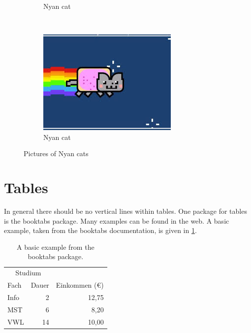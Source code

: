 \documentclass[12pt, %
               a4paper, %
               twoside, %
               openright, %
               abstract=on, %
               DIV=11,      %
               BCOR=8mm]{scrbook} %
\begin{document}
\begin{figure}
\begin{subfigure}[b]{0.3\textwidth}
                \caption{Nyan cat}
                \label{fig:cat2} 
        \end{subfigure}
        ~ %
        \begin{subfigure}[b]{0.3\textwidth}
                \includegraphics[width=\textwidth]{img/cat.jpeg}
                \caption{Nyan cat}
                \label{fig:cat3}  
        \end{subfigure}
	\caption[Nyan cats]{Pictures of Nyan cats}\label{fig:cats}
\end{figure}


\FloatBarrier

\section{Tables}
In general there should be no vertical lines within tables.
One package for tables is the booktabs package.
Many examples can be found in the web.
A basic example, taken from the booktabs documentation, is given in \cref{tab::ex}.

\begin{table}
\centering
	\begin{tabular}{lrr} 
	\toprule
	\multicolumn{2}{c}{Studium}\\ \cmidrule{1-2}
	Fach & Dauer & Einkommen (\euro)\\ 
	\midrule 
	Info & 2 & 12,75 \\ \addlinespace
	MST & 6 & 8,20 \\ \addlinespace
	VWL & 14 & 10,00\\ 
	\bottomrule
\end{tabular}
\caption[Table Example]{A basic example from the booktabs package.}
\label{tab::ex}
\end{table}
\FloatBarrier
\end{document}
